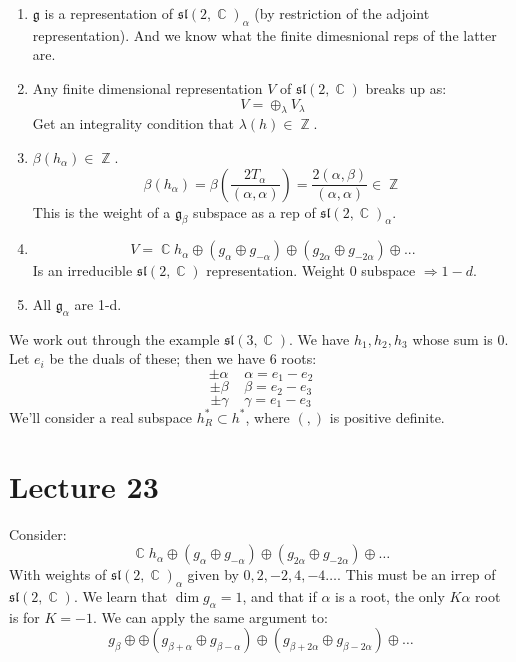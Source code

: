 \documentclass[12 pt]{article}
\DeclareMathOperator {\C} {\mathbb{C}}
\DeclareMathOperator {\Z} {\mathbb{Z}}
\theoremstyle{plain}
\theoremstyle{definition}
\theoremstyle{remark}
\begin{document}
\begin{enumerate}
\item $\mathfrak{g}$ is a representation of $\mathfrak{sl(2,\C)}_{\alpha}$ (by restriction of the adjoint representation). And we know what the finite dimesnional reps of the latter are.
\item Any finite dimensional representation $V$ of $\mathfrak{sl}(2,\C)$ breaks up as:
\[       V = \oplus_{\lambda}  V_{\lambda}     \]
Get an integrality condition that $\lambda(h) \in \Z$.
\item $\beta(h_{\alpha}) \in \Z$. 
\[    \beta(h_{\alpha}) = \beta\left( \frac{2T_{\alpha}}{(\alpha, \alpha)} \right)  = \frac{2(\alpha, \beta)}{(\alpha, \alpha)} \in \Z    \]
This is the weight of a $\mathfrak{g}_{\beta}$ subspace as a rep of $\mathfrak{sl}(2,\C)_{\alpha}$.
\item \[     V = \C h_{\alpha} \oplus (g_{\alpha} \oplus g_{-\alpha}) \oplus  (g_{2\alpha} \oplus g_{-2\alpha})  \oplus ...   \]
Is an irreducible $\mathfrak{sl}(2,\C)$ representation. Weight 0 subspace $\Rightarrow 1-d$.
\item All $\mathfrak{g}_{\alpha}$ are 1-d.
\end{enumerate}
We work out through the example $\mathfrak{sl}(3,\C)$. We have $h_1, h_2, h_3$ whose sum is 0. Let $e_i$ be the duals of these; then we have 6 roots:
\[         \pm \alpha \;\;\;\; \alpha = e_1 - e_2       \]
\[         \pm \beta \;\;\;\; \beta = e_2 - e_3       \]
\[         \pm \gamma \;\;\;\; \gamma = e_1 - e_3       \]
We'll consider a real subspace $h_R^* \subset h^*$, where $(,)$ is positive definite. 


\section*{Lecture 23}
Consider:
\[          \C h_{\alpha} \oplus (g_{\alpha} \oplus g_{-\alpha}) \oplus (g_{2\alpha} \oplus g_{-2\alpha}) \oplus \dots  \]
With weights of $\mathfrak{sl}(2,\C)_{\alpha}$ given by $0, 2, -2, 4, -4 \dots$. This must be an irrep of $\mathfrak{sl}(2,\C)$. We learn that $\dim g_{\alpha} = 1$, and that if $\alpha$ is a root, the only $K\alpha$ root is for $K = -1$. We can apply the same argument to:
\[        g_{\beta} \oplus  \oplus (g_{\beta + \alpha} \oplus g_{\beta-\alpha}) \oplus (g_{\beta + 2\alpha} \oplus g_{\beta-2\alpha}) \oplus \dots     \]
\end{document}
